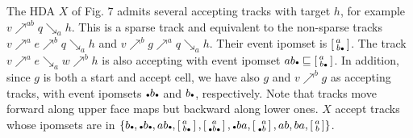 \documentclass[10pt,a4paper]{article}
\begin{document}
The HDA $X$ of Fig. 7 admits several accepting tracks with target $h$, for example $v\mathrel{\nearrow^{ab}}q\mathrel{\searrow_{a}}h$. This is a sparse track and equivalent to the non-sparse tracks $v\mathrel{\nearrow^{a}}e\mathrel{\nearrow^{b}}q\mathrel{\searrow_{a}}h$ and $v\mathrel{\nearrow^{b}}g\mathrel{\nearrow^{a}}q\mathrel{\searrow_{a}}h$. Their event ipomset is $\left[\begin{smallmatrix}a\hphantom{\vbox{\hbox{\tiny$\bullet$}}}\\
b\vbox{\hbox{\tiny$\bullet$}}\end{smallmatrix}\right]$. The track $v\mathrel{\nearrow^{a}}e\mathrel{\searrow_{a}}w\mathrel{\nearrow^{b}}h$ is also accepting with event ipomset $ab\vbox{\hbox{\tiny$\bullet$}}\sqsubseteq\left[\begin{smallmatrix}a\hphantom{\vbox{\hbox{\tiny$\bullet$}}}\\
b\vbox{\hbox{\tiny$\bullet$}}\end{smallmatrix}\right]$. In addition, since $g$ is both a start and accept cell, we have also $g$ and $v\mathrel{\nearrow^{b}}g$ as accepting tracks, with event ipomsets $\vbox{\hbox{\tiny$\bullet$}}b\vbox{\hbox{\tiny$\bullet$}}$ and $b\vbox{\hbox{\tiny$\bullet$}}$, respectively. Note that tracks move forward along upper face maps but backward along lower ones. $X$ accept tracks whose ipomsets are in ${\{b\vbox{\hbox{\tiny$\bullet$}},\vbox{\hbox{\tiny$\bullet$}}b\vbox{\hbox{\tiny$\bullet$}},ab\vbox{\hbox{\tiny$\bullet$}},\left[\begin{smallmatrix}a\hphantom{\vbox{\hbox{\tiny$\bullet$}}}\\
b\vbox{\hbox{\tiny$\bullet$}}\end{smallmatrix}\right],\left[\begin{smallmatrix}a\\
\vbox{\hbox{\tiny$\bullet$}}b\vbox{\hbox{\tiny$\bullet$}}\end{smallmatrix}\right],\vbox{\hbox{\tiny$\bullet$}}ba,\left[\begin{smallmatrix}\hphantom{\vbox{\hbox{\tiny$\bullet$}}}a\\
\vbox{\hbox{\tiny$\bullet$}}b\end{smallmatrix}\right],ab,ba,\left[\begin{smallmatrix}a\\
b\end{smallmatrix}\right]\}}$.\par
 
 
\end{document}

